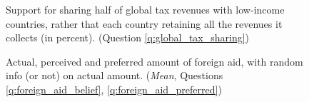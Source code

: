 \begin{figure}[h!]
    \caption[Support for sharing half of global tax revenues with low-income countries]{Support for sharing half of global tax revenues with low-income countries, rather that each country retaining all the revenues it collects (in percent). (Question \ref{q:global_tax_sharing})}\label{fig:global_tax_sharing}
\end{figure}

\begin{figure} 
    \caption[Actual, perceived and preferred amount of foreign aid (mean)]{Actual, perceived and preferred amount of foreign aid, with random info (or not) on actual amount. (\textit{Mean}, Questions \ref{q:foreign_aid_belief}, \ref{q:foreign_aid_preferred})}\label{fig:foreign_aid_amount}
\end{figure}


